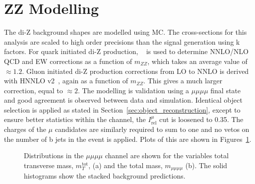 \section{ZZ Modelling}
\label{sec:zz_modelling}

The di-Z background shapes are modelled using MC.
The cross-sections for this analysis are scaled to high order precisions than the signal generation using k factors.
For quark initiated di-Z production, \POWHEG~\cite{} is used to determine NNLO/NLO QCD and EW corrections as a function of $m_{ZZ}$, which takes an average value of $\approx 1.2$.
Gluon initiated di-Z production corrections from LO to NNLO is derived with HNNLO v2~\cite{}, again as a function of $m_{ZZ}$.
This gives a much larger correction, equal to $\approx 2$.
The modelling is validation using a $\mu\mu\mu\mu$ final state and good agreement is observed between data and simulation.
Identical object selection is applied as stated in Section~\ref{sec:object_reconstruction}, except to ensure better statistics within the channel, the $I_{\text{rel}}^{\mu}$ cut is loosened to 0.35.
The charges of the $\mu$ candidates are similarly required to sum to one and no vetos on the number of b jets in the event is applied.
Plots of this are shown in Figures~\ref{fig:4tau_mmmm}. \\

\begin{figure}[!hbtp]
\centering
\caption{Distributions in the $\mu\mu\mu\mu$ channel are shown for the variables total transverse mass, $m_{T}^{\text{tot}}$, (a) and the total mass, $m_{\mu\mu\mu\mu}$ (b). The solid histograms show the stacked background predictions.}
\label{fig:4tau_mmmm}
\end{figure}


